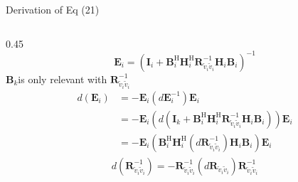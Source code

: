 \documentclass[aspectratio=169, 10pt]{beamer}
\begin{document}
\begin{frame}[label=app-wmmse-grad2]{Derivation of Eq (21)}
    \begin{columns}
        \begin{column}{0.45\paperwidth}
            \begin{equation*}
                \mathbf{E}_i = \left(\mathbf{I}_i+\mathbf{B}_i^{\mathrm{H}}
                \mathbf{H}_i^{\mathrm{H}} \mathbf{R}_{\tilde{v}_i \tilde{v}_i}^{-1} \mathbf{H}_i
                \mathbf{B}_i\right)^{-1}
            \end{equation*}
            \hspace{1em}
            $\mathbf{B}_k$is only  relevant with $\mathbf{R}_{\tilde{v}_i \tilde{v}_i}^{-1}$
            \begin{align*}
                d\left(\mathbf{E}_i\right)
                 & = -\mathbf{E}_i \left(d\mathbf{E}_i^{-1}\right)\mathbf{E}_i                                                                                                                                     \\
                 & = -\mathbf{E}_i \left(d \left( \mathbf{I}_k+\mathbf{B}_i^{\mathrm{H}}  \mathbf{H}_i^{\mathrm{H}} \mathbf{R}_{\tilde{v}_i \tilde{v}_i}^{-1} \mathbf{H}_i \mathbf{B}_i \right)\right)\mathbf{E}_i \\
                 & = -\mathbf{E}_i \left(\mathbf{B}_i^{\mathrm{H}} \mathbf{H}_i^{\mathrm{H}} \left(d\mathbf{R}_{\tilde{v}_i \tilde{v}_i}^{-1}\right) \mathbf{H}_i \mathbf{B}_i \right)\mathbf{E}_i
            \end{align*}
            \begin{eqnarray*}
                d\left(\mathbf{R}_{\tilde{v}_i \tilde{v}_i}^{-1}\right) =-\mathbf{R}_{\tilde{v}_i \tilde{v}_i}^{-1}\left(d\mathbf{R}_{\tilde{v}_i \tilde{v}_i}\right)\mathbf{R}_{\tilde{v}_i \tilde{v}_i}^{-1}
            \end{eqnarray*}
        \end{column}


\end{columns}
\end{frame}
\end{document}
